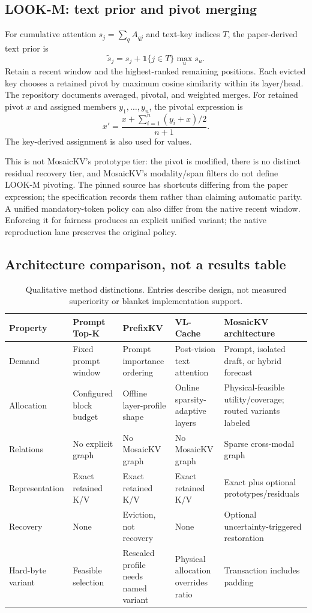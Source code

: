 \subsection{LOOK-M: text prior and pivot merging}
For cumulative attention $s_j=\sum_q A_{qj}$ and text-key indices $T$, the
paper-derived text prior is
\begin{equation}
 \widetilde s_j=s_j+\mathbf1\{j\in T\}\max_u s_u.
\end{equation}
Retain a recent window and the highest-ranked remaining positions. Each evicted
key chooses a retained pivot by maximum cosine similarity within its layer/head.
The repository documents averaged, pivotal, and weighted merges. For retained
pivot $x$ and assigned members $y_1,\ldots,y_n$, the pivotal expression is
\begin{equation}
 x'=\frac{x+\sum_{i=1}^n(y_i+x)/2}{n+1}.
\end{equation}
The key-derived assignment is also used for values.

This is not MosaicKV's prototype tier: the pivot is modified, there is no
distinct residual recovery tier, and MosaicKV's modality/span filters do not
define LOOK-M pivoting. The pinned source has shortcuts differing from the
paper expression; the specification records them rather than claiming automatic
parity. A unified mandatory-token policy can also differ from the native recent
window. Enforcing it for fairness produces an explicit unified variant; the
native reproduction lane preserves the original policy.

\subsection{Architecture comparison, not a results table}
\begin{table}[t]
\caption{Qualitative method distinctions. Entries describe design, not
measured superiority or blanket implementation support.}
\small\begin{tabularx}{\textwidth}{P{2cm}YYYY}\toprule
Property & Prompt Top-K & PrefixKV & VL-Cache & MosaicKV architecture\\\midrule
Demand & Fixed prompt window & Prompt importance ordering & Post-vision text attention & Prompt, isolated draft, or hybrid forecast\\
Allocation & Configured block budget & Offline layer-profile shape & Online sparsity-adaptive layers & Physical-feasible utility/coverage; routed variants labeled\\
Relations & No explicit graph & No MosaicKV graph & No MosaicKV graph & Sparse cross-modal graph\\
Representation & Exact retained K/V & Exact retained K/V & Exact retained K/V & Exact plus optional prototypes/residuals\\
Recovery & None & Eviction, not recovery & None & Optional uncertainty-triggered restoration\\
Hard-byte variant & Feasible selection & Rescaled profile needs named variant & Physical allocation overrides ratio & Transaction includes padding\\
\bottomrule\end{tabularx}
\end{table}

